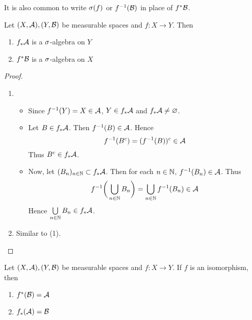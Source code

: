 \documentclass{book}
\begin{document}
	\begin{note}
		It is also common to write $\sigma(f)$ or $f^{-1}(\mathcal{B})$ in place of $f^*\mathcal{B}$.
	\end{note}	
	
	\begin{ex}  
		Let $(X,\mathcal{A}), (Y,\mathcal{B})$ be measurable spaces and $f: X \rightarrow Y$. Then 
		\begin{enumerate}
			\item $f_*\mathcal{A}$ is a $\sigma$-algebra on $Y$
			\item $f^*\mathcal{B}$ is a $\sigma$-algebra on $X$
		\end{enumerate}
	\end{ex}
	
	\begin{proof}\
		\begin{enumerate}
			\item 
			\begin{itemize}
				\item Since $f^{-1}(Y) = X \in \mathcal{A}$, $Y \in f_*\mathcal{A}$ and $f_*\mathcal{A} \neq \varnothing$. 
				\item Let $B \in f_*\mathcal{A}$. Then $f^{-1}(B) \in \mathcal{A}$. Hence $$f^{-1}(B^c) = (f^{-1}(B))^c \in \mathcal{A}$$ Thus $B^c \in f_*\mathcal{A}$. 
				\item Now, let $(B_n)_{n \in \mathbb{N}} \subset f_*\mathcal{A}$. Then for each $n \in \mathbb{N}$, $f^{-1}(B_n) \in \mathcal{A}$. Thus $$f^{-1}\bigg(\bigcup_{n \in \mathbb{N}} B_n \bigg) = \bigcup_{n \in \mathbb{N}} f^{-1}(B_n) \in \mathcal{A}$$ Hence $\bigcup\limits_{n \in \mathbb{N}} B_n \in f_*\mathcal{A}$.
			\end{itemize}
			\item Similar to (1).
		\end{enumerate}
	\end{proof}

	\begin{ex} 
		Let $(X,\mathcal{A}), (Y,\mathcal{B})$ be measurable spaces and $f: X \rightarrow Y$. If $f$ is an isomorphism, then
		\begin{enumerate}
			\item $f^*(\mathcal{B}) = \mathcal{A}$
			\item $f_*(\mathcal{A}) = \mathcal{B}$
		\end{enumerate}
	\end{ex}
\end{document}

